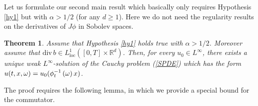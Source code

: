 \documentclass[a4paper,11pt]{article}
\newtheorem{theorem}{Theorem}
\newcommand{\RR}{\mathbb{R}}
\newcommand{\loc}{\mathrm{loc}}
\begin{document}
\medskip Let us formulate our second main result which basically
 only requires Hypothesis \ref{hy1} but with $\alpha > 1/2$  (for any
$d \ge 1$). Here   we do not need the regularity results on the
derivatives of $J \phi$ in Sobolev spaces.


\begin{theorem}
\label{thm SPDE n3} Assume that Hypothesis \ref{hy1} holds true with
$\alpha > 1/2$. Moreover assume
  that  $\mathrm{div}\, b\in
L^1_\loc([0,T]\times\RR^d)$. Then, for  every  $ u_{0}\in L^{\infty
}$, there exists a unique weak $L^{\infty }$-solution of
the Cauchy problem (\ref{SPDE}) which has the form $u(t,x,\omega )=u_{0}({%
\phi }_{t}^{-1}\left( \omega \right) x)$.
\end{theorem}

The proof requires the following lemma, in which we provide a
   special bound
  for the commutator.
\end{document}
